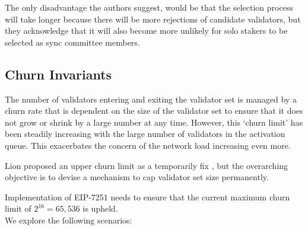 \documentclass[UTF8]{article}
\begin{document}
The only disadvantage the authors suggest, would be that the selection process will take longer because there will be more rejections of candidate validators, but they acknowledge that it will also become more unlikely for solo stakers to be selected as sync committee members.
\subsection{Churn Invariants}
The number of validators entering and exiting the validator set is managed by a churn rate that is dependent on the size of the validator set to ensure that it does not grow or shrink by a large number at any time. However, this `churn limit' has been steadily increasing with the large number of validators in the activation queue. This exacerbates the concern of the network load increasing even more. 

Lion \cite{dapplion} proposed an upper churn limit as a temporarily fix \cite{dapplion}, but the overarching objective is to devise a mechanism to cap validator set size permanently.

Implementation of EIP-7251 needs to ensure that the current maximum churn limit of $2^{16} = 65,536$ is upheld.\\

\noindent
We explore the following scenarios:
\end{document}
